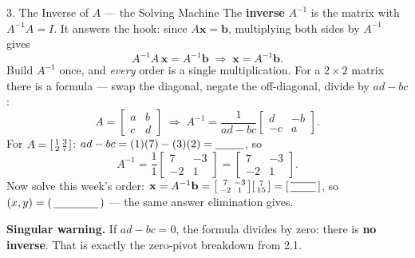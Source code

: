 \documentclass[10pt]{article}
\newcommand{\xx}{\mathbf{x}}
\newcommand{\bb}{\mathbf{b}}
\begin{document}
\begin{notesbox}{3. The Inverse of $A$ --- the Solving Machine}
The \textbf{inverse} $A^{-1}$ is the matrix with $A^{-1}A=I$. It answers the hook: since
$A\xx=\bb$, multiplying both sides by $A^{-1}$ gives
\[
  A^{-1}A\,\xx = A^{-1}\bb \;\Longrightarrow\; \xx = A^{-1}\bb.
\]
Build $A^{-1}$ once, and \emph{every} order is a single multiplication. For a $2\times2$ matrix there
is a formula --- swap the diagonal, negate the off-diagonal, divide by $ad-bc$:
\[
  A = \begin{bmatrix} a & b \\ c & d \end{bmatrix} \;\Longrightarrow\;
  A^{-1} = \frac{1}{ad-bc}\begin{bmatrix} d & -b \\ -c & a \end{bmatrix}.
\]
For $A=\begin{bsmallmatrix} 1&3\\2&7 \end{bsmallmatrix}$: $ad-bc = (1)(7)-(3)(2) = \blank{0.9cm}$, so
\[
  A^{-1} = \frac{1}{1}\begin{bmatrix} 7 & -3 \\ -2 & 1 \end{bmatrix} = \begin{bmatrix} 7 & -3 \\ -2 & 1 \end{bmatrix}.
\]
Now solve this week's order: $\xx = A^{-1}\bb = \begin{bsmallmatrix} 7&-3\\-2&1 \end{bsmallmatrix}\begin{bsmallmatrix} 7\\15 \end{bsmallmatrix} = \begin{bsmallmatrix}\blank{0.8cm}\\[2pt]\blank{0.8cm}\end{bsmallmatrix}$,
so $(x,y)=(\,\blank{1.4cm}\,)$ --- the same answer elimination gives.

\vspace{3pt}
\textbf{Singular warning.} If $ad-bc=0$, the formula divides by zero: there is \textbf{no inverse}.
That is exactly the zero-pivot breakdown from 2.1.
\end{notesbox}
\end{document}
